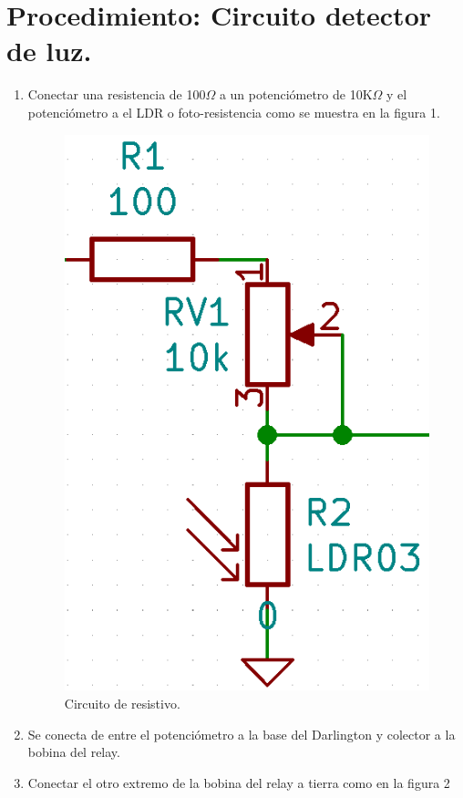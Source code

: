 \documentclass[letterpaper]{article}
\begin{document}
\section{Procedimiento: Circuito detector de luz.}
\begin{large}
    \begin{enumerate}
        \item Conectar una resistencia de 100$\Omega$ a un potenciómetro de 10K$\Omega$ y el potenciómetro a el LDR o foto-resistencia como se muestra en la figura 1.
        \begin{figure}[htbp]
            \centering
            \includegraphics[scale=0.4]{IMG/CIRLuz2.png}
            \caption{Circuito de resistivo.}
            \label{fig:cir1}
        \end{figure}
        \item Se conecta de entre el potenciómetro a la base del Darlington y colector a la bobina del relay.
        \item Conectar el otro extremo de la bobina del relay a tierra como en la figura 2

\end{enumerate}
\end{large}
\end{document}
